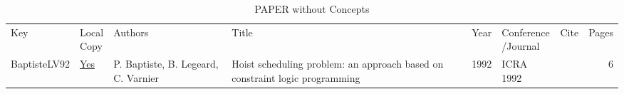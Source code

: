 {\scriptsize
\begin{longtable}{llp{5cm}p{10cm}rp{3cm}lr}
\rowcolor{white}\caption{PAPER without Concepts}\\ \toprule
\rowcolor{white}Key & \shortstack{Local\\Copy} & Authors & Title & Year & \shortstack{Conference\\/Journal} & Cite & Pages\\ \midrule
\endhead
\bottomrule
\endfoot
BaptisteLV92 & \href{works/BaptisteLV92.pdf}{Yes} & P. Baptiste, B. Legeard, C. Varnier & Hoist scheduling problem: an approach based on constraint logic programming & 1992 & ICRA 1992 & \cite{BaptisteLV92} & 6\\\end{longtable}
}

